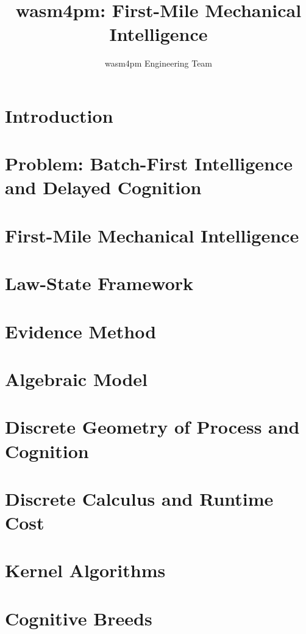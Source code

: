 

\title{\textbf{wasm4pm: First-Mile Mechanical Intelligence}}
\author{wasm4pm Engineering Team}
\maketitle
\tableofcontents
\newpage
\section{Introduction}
\section{Problem: Batch-First Intelligence and Delayed Cognition}
\section{First-Mile Mechanical Intelligence}
\section{Law-State Framework}
\section{Evidence Method}
\section{Algebraic Model}
\section{Discrete Geometry of Process and Cognition}
\section{Discrete Calculus and Runtime Cost}
\section{Kernel Algorithms}
\section{Cognitive Breeds}
